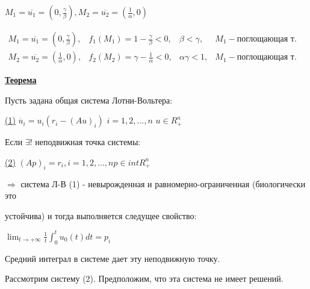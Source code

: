 \documentclass[oneside, final, 12pt]{article}
\begin{document}
\begin{large}
\newpage
$M_1 = \overline{u_1} = (0 , \frac{\gamma}{\beta}),$\hspace{0.2cm}$M_2 = \overline{u_2} = (\frac{1}{\alpha} , 0)$

\vspace{0.5cm}
$
	\begin{matrix}
	M_1 = \overline{u_1} = (0 , \frac{\gamma}{\beta}), & f_1(M_1) = 1 - \frac{\gamma}{\beta} < 0,&\beta < \gamma,  & M_1- {\text {поглощающая т.}}\\
	M_2 = \overline{u_2} = (\frac{1}{\alpha} , 0), & f_2(M_2) = \gamma - \frac{1}{\alpha}<0,&\alpha\gamma < 1, & M_1- {\text {поглощающая т.}}
	\end{matrix}
$


\vspace{0.5cm}
\textbf{\underline{Теорема}}

Пусть задана общая система Лотни-Вольтера:

\underline{(1)} $\dot{u_i} = u_i(r_i - (Au)_i)$ \hspace{0.2cm} $i = 1,2,...,n$ \hspace{0.2cm} $u \in R_+^n$
 
Если $\exists ! $ неподвижная точка системы:

\underline{(2)} $(Ap)_i = r_i, $\hspace{0.2cm}$ i = 1,2,...,n$\hspace{0.2cm}$ p \in intR_+^n$


$\Rightarrow$ система Л-В (1) - невырожденная и равномерно-ограниченная (биологически это

устойчива) и тогда выполняется следущее свойство:

\vspace{0.2cm}
\begin{center}
\begin{Large}
$
\lim_{t \to +\infty} \frac{1}{t}\int_0^t u_0(t)dt = p_i
$
\end{Large}

\end{center}
\begin{figure} [h!]
			\caption{}	
\end{figure} 

Средний интеграл в системе дает эту неподвижную точку.

\vspace{0.5cm}
Рассмотрим систему (2). Предположим, что эта система не имеет решений.


\end{large}
\end{document}
